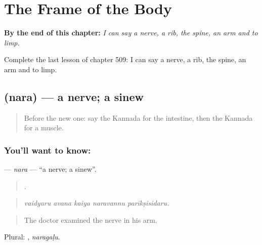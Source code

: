 
\chapter{The Frame of the Body}
\label{ch:ka-the-frame-of-the-body}

\begin{chapteropening}
\textbf{By the end of this chapter:} \emph{I can say a nerve, a rib, the spine, an arm and to limp.}

Complete the last lesson of chapter 509: I can say a nerve, a rib, the spine, an arm and to limp.
\end{chapteropening}

\section[\texorpdfstring{\kn{ನರ} (nara)}{ನರ (nara)}]{ (nara) — a nerve; a sinew}

\label{lesson:KA-C509-nara}



\begin{quote}
Before the new one: say the Kannada for the intestine, then the Kannada for a muscle.
\end{quote}

\subsection*{You'll want to know: }
\textbf{} — \emph{nara} — \textquotedblleft{}a nerve; a sinew\textquotedblright{}.

\begin{quote}
    .
\end{quote}

\begin{quote}
\emph{vaidyaru avana kaiya naravannu parīkṣisidaru.}
\end{quote}

\begin{quote}
The doctor examined the nerve in his arm.
\end{quote}

Plural: , \emph{naragaḷu}.

